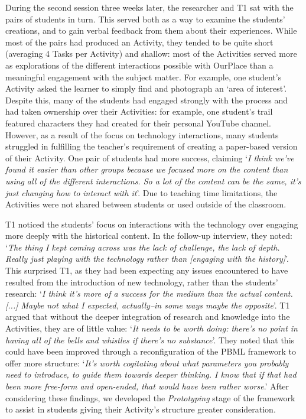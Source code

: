 \documentclass[,hyphens]{sigchi}
\begin{document}
During the second session three weeks later, the researcher and T1 sat with the pairs of students in turn. This served both as a way to examine the students' creations, and to gain verbal feedback from them about their experiences. While most of the pairs had produced an Activity, they tended to be quite short (averaging 4 Tasks per Activity) and shallow: most of the Activities served more as explorations of the different interactions possible with OurPlace than a meaningful engagement with the subject matter. For example, one student's Activity asked the learner to simply find and photograph an `area of interest'. Despite this, many of the students had engaged strongly with the process and had taken ownership over their Activities: for example, one student's trail featured characters they had created for their personal YouTube channel. However, as a result of the focus on technology interactions, many students struggled in fulfilling the teacher's requirement of creating a paper-based version of their Activity. One pair of students had more success, claiming `\textit{I think we've found it easier than other groups because we focused more on the content than using all of the different interactions. So a lot of the content can be the same, it's just changing how to interact with it}'. Due to teaching time limitations, the Activities were not shared between students or used outside of the classroom.

T1 noticed the students' focus on interactions with the technology over engaging more deeply with the historical content. In the follow-up interview, they noted: `\textit{The thing I kept coming across was the lack of challenge, the lack of depth. Really just playing with the technology rather than [engaging with the history]}'. This surprised T1, as they had been expecting any issues encountered to have resulted from the introduction of new technology, rather than the students' research: `\textit{I think it's more of a success for the medium than the actual content. [...] Maybe not what I expected, actually--in some ways maybe the opposite}'. T1 argued that without the deeper integration of research and knowledge into the Activities, they are of little value: `\textit{It needs to be worth doing: there's no point in having all of the bells and whistles if there's no substance}'. They noted that this could have been improved through a reconfiguration of the PBML framework to offer more structure: `\textit{It's worth cogitating about what parameters you probably need to introduce, to guide them towards deeper thinking. I know that if that had been more free-form and open-ended, that would have been rather worse}.' After considering these findings, we developed the \textit{Prototyping} stage of the framework to assist in students giving their Activity's structure greater consideration.
\end{document}
